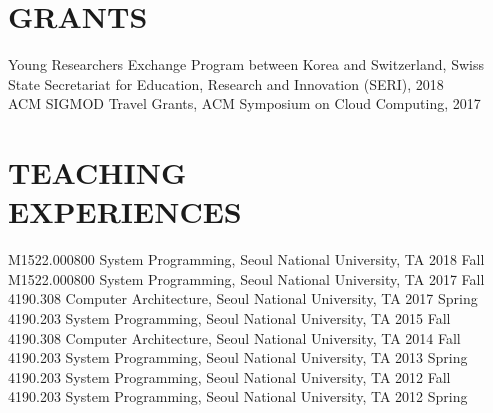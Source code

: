 \documentclass[margin]{res}
\begin{document}
\begin{resume}
\section{GRANTS}
\par
Young Researchers Exchange Program between Korea and Switzerland, Swiss State Secretariat for Education, Research and Innovation (SERI), 2018 \\

\vspace{-1.8em}
ACM SIGMOD Travel Grants, ACM Symposium on Cloud Computing, 2017


\vspace{-0.2em}
\section{TEACHING \\ EXPERIENCES}
\par
M1522.000800 System Programming, Seoul National University, TA \hfill 2018 Fall \\
M1522.000800 System Programming, Seoul National University, TA \hfill 2017 Fall \\
4190.308 Computer Architecture, Seoul National University, TA \hfill 2017 Spring \\
4190.203 System Programming, Seoul National University, TA \hfill 2015 Fall \\
4190.308 Computer Architecture, Seoul National University, TA \hfill 2014 Fall \\
4190.203 System Programming, Seoul National University, TA \hfill 2013 Spring \\
4190.203 System Programming, Seoul National University, TA \hfill 2012 Fall \\
4190.203 System Programming, Seoul National University, TA \hfill 2012 Spring \\

\vspace{-1.5em}

\end{resume}
\end{document}
